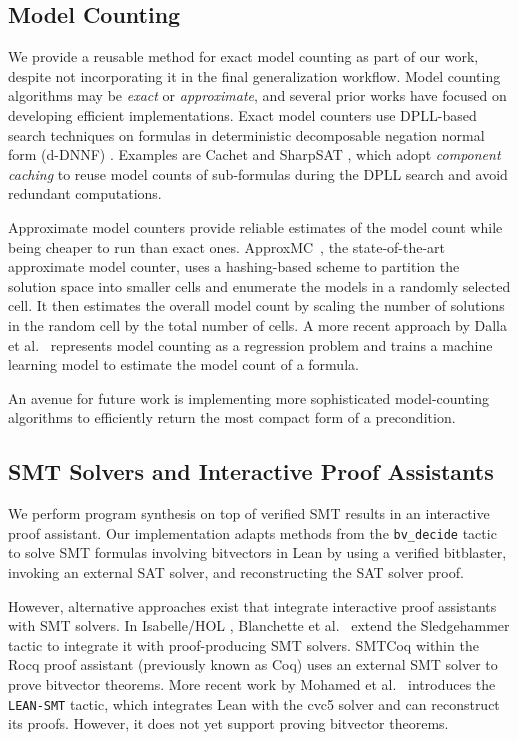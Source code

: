 \documentclass[review, anonymous, acmsmall]{acmart}
\begin{document}
\subsection{Model Counting}
We provide a reusable method for exact model counting as part of our work, despite not incorporating it in the final generalization workflow. Model counting algorithms may be \textit{exact} or \textit{approximate}, and several prior works have focused on developing efficient implementations. Exact model counters use DPLL-based search techniques on formulas in deterministic decomposable negation normal form (d-DNNF) \cite{darwiche_new_2004}. Examples are Cachet \cite{sang_combining_2004} and SharpSAT \cite{thurley_sharpsat_2006}, which adopt \textit{component caching} to reuse model counts of sub-formulas during the DPLL search and avoid redundant computations. 

Approximate model counters provide reliable estimates of the model count while being cheaper to run than exact ones. ApproxMC~\cite{chakraborty_scalable_2013}, the state-of-the-art approximate model counter, uses a hashing-based scheme to partition the solution space into smaller cells and enumerate the models in a randomly selected cell. It then estimates the overall model count by scaling the number of solutions in the random cell by the total number of cells. A more recent approach by Dalla et al.~\cite{dalla_machine_2024} represents model counting as a regression problem and trains a machine learning model to estimate the model count of a formula.

An avenue for future work is implementing more sophisticated model-counting algorithms to efficiently return the most compact form of a precondition. 

\subsection{SMT Solvers and Interactive Proof Assistants}
We perform program synthesis on top of verified SMT results in an interactive proof assistant. Our implementation adapts methods from the \texttt{bv\_decide} tactic~\cite{noauthor_bvdecide_nodate} to solve SMT formulas involving bitvectors in Lean by using a verified bitblaster, invoking an external SAT solver, and reconstructing the SAT solver proof.

However, alternative approaches exist that integrate interactive proof assistants with SMT solvers. In Isabelle/HOL \cite{nipkow_isabellehol_2002}, Blanchette et al.~\cite{blanchette_extending_2011} extend the Sledgehammer tactic to integrate it with proof-producing SMT solvers. SMTCoq \cite{ekici_smtcoq_2017} within the Rocq proof assistant (previously known as Coq) \cite{bertot_interactive_2013} uses an external SMT solver to prove bitvector theorems. More recent work by Mohamed et al.~\cite{mohamed_lean-smt_2025} introduces the \texttt{LEAN-SMT} tactic, which integrates Lean with the cvc5 solver \cite{barbosa_cvc5_2022} and can reconstruct its proofs. However, it does not yet support proving bitvector theorems. 
\end{document}
